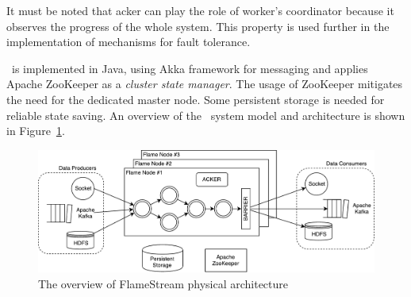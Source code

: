 It must be noted that acker can play the role of worker's coordinator because it observes the progress of the whole system. This property is used further in the implementation of mechanisms for fault tolerance. 

\FlameStream\ is implemented in Java, using Akka framework for messaging and applies Apache ZooKeeper as a {\it cluster state manager}. The usage of ZooKeeper mitigates the need for the dedicated master node. Some persistent storage is needed for reliable state saving. An overview of the \FlameStream\ system model and architecture is shown in Figure~\ref{arch}.

\begin{figure}[htbp]
  \centering
  \includegraphics[scale=0.58]{pics/arch}
  \caption{The overview of FlameStream physical architecture}
  \label {arch}
\end{figure}
